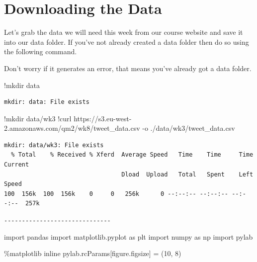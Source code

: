 \documentclass[
  letterpaper,
  DIV=11,
  numbers=noendperiod]{scrreprt}
\newenvironment{Shaded}{\begin{snugshade}}{\end{snugshade}}
\newcommand{\DecValTok}[1]{\textcolor[rgb]{0.68,0.00,0.00}{#1}}
\newcommand{\ErrorTok}[1]{\textcolor[rgb]{0.68,0.00,0.00}{#1}}
\newcommand{\FloatTok}[1]{\textcolor[rgb]{0.68,0.00,0.00}{#1}}
\newcommand{\ImportTok}[1]{\textcolor[rgb]{0.00,0.46,0.62}{#1}}
\newcommand{\NormalTok}[1]{\textcolor[rgb]{0.00,0.23,0.31}{#1}}
\newcommand{\OperatorTok}[1]{\textcolor[rgb]{0.37,0.37,0.37}{#1}}
\newcommand{\StringTok}[1]{\textcolor[rgb]{0.13,0.47,0.30}{#1}}
\begin{document}
\hypertarget{downloading-the-data-1}{%
\section{Downloading the Data}\label{downloading-the-data-1}}

Let's grab the data we will need this week from our course website and
save it into our data folder. If you've not already created a data
folder then do so using the following command.

Don't worry if it generates an error, that means you've already got a
data folder.

\begin{Shaded}
\begin{Highlighting}[]
\OperatorTok{!}\NormalTok{mkdir data}
\end{Highlighting}
\end{Shaded}

\begin{verbatim}
mkdir: data: File exists
\end{verbatim}

\begin{Shaded}
\begin{Highlighting}[]
\OperatorTok{!}\NormalTok{mkdir data}\OperatorTok{/}\NormalTok{wk3}
\OperatorTok{!}\NormalTok{curl https:}\OperatorTok{//}\NormalTok{s3.eu}\OperatorTok{{-}}\NormalTok{west}\OperatorTok{{-}}\FloatTok{2.}\ErrorTok{amazonaws}\NormalTok{.com}\OperatorTok{/}\NormalTok{qm2}\OperatorTok{/}\NormalTok{wk8}\OperatorTok{/}\NormalTok{tweet\_data.csv }\OperatorTok{{-}}\NormalTok{o .}\OperatorTok{/}\NormalTok{data}\OperatorTok{/}\NormalTok{wk3}\OperatorTok{/}\NormalTok{tweet\_data.csv}
\end{Highlighting}
\end{Shaded}

\begin{verbatim}
mkdir: data/wk3: File exists
  % Total    % Received % Xferd  Average Speed   Time    Time     Time  Current
                                 Dload  Upload   Total   Spent    Left  Speed
100  156k  100  156k    0     0   256k      0 --:--:-- --:--:-- --:--:--  257k
\end{verbatim}

\texttt{-\/-\/-\/-\/-\/-\/-\/-\/-\/-\/-\/-\/-\/-\/-\/-\/-\/-\/-\/-\/-\/-\/-\/-\/-\/-\/-\/-\/-\/-}

\begin{Shaded}
\begin{Highlighting}[]
\ImportTok{import}\NormalTok{ pandas}
\ImportTok{import}\NormalTok{ matplotlib.pyplot }\ImportTok{as}\NormalTok{ plt}
\ImportTok{import}\NormalTok{ numpy }\ImportTok{as}\NormalTok{ np}
\ImportTok{import}\NormalTok{ pylab}

\OperatorTok{\%}\NormalTok{matplotlib inline}
\NormalTok{pylab.rcParams[}\StringTok{\textquotesingle{}figure.figsize\textquotesingle{}}\NormalTok{] }\OperatorTok{=}\NormalTok{ (}\DecValTok{10}\NormalTok{, }\DecValTok{8}\NormalTok{)}
\end{Highlighting}
\end{Shaded}
\end{document}
